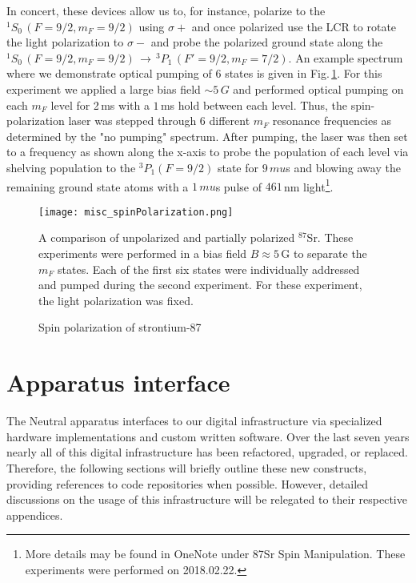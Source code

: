 In concert, these devices allow us to, for instance, polarize to the $^1S_0\,(F=9/2, m_F=9/2)$ using $\sigma+$ and once polarized use the LCR to rotate the light polarization to $\sigma-$ and probe the polarized ground state along the $^1S_0\,(F=9/2,m_F=9/2)\,\rightarrow\,^3P_1\,(F'=9/2,m_F=7/2)$.
An example spectrum where we demonstrate optical pumping of 6 states is given in Fig.\,\ref{fig:spinPolSpectra}. 
For this experiment we applied a large bias field $\sim5\,G$ and performed optical pumping on each $m_F$ level for 2\,ms with a $1\,$ms hold between each level.
Thus, the spin-polarization laser was stepped through 6 different $m_F$ resonance frequencies as determined by the "no pumping" spectrum.
After pumping, the laser was then set to a frequency as shown along the x-axis to probe the population of each level via shelving population to the $^3P_1 (F=9/2)$ state for $9\,mu$s and blowing away the remaining ground state atoms with a $1\,mu$s pulse of $461\,$nm light\footnote{More details may be found in OneNote under 87Sr Spin Manipulation. These experiments were performed on 2018.02.22.}.
	\begin{figure}
	\centerline{
		\texttt{[image: misc\_spinPolarization.png]}}
		\caption{Spin polarization of strontium-87}{A comparison of unpolarized and partially polarized $^{87}$Sr. These experiments were performed in a bias field $B\approx5\,$G to separate the $m_F$ states. Each of the first six states were individually addressed and pumped during the second experiment. For these experiment, the light polarization was fixed.}
		 \label{fig:spinPolSpectra}
	\end{figure}



\newpage
\section{Apparatus interface} \label{sec:electronics}
\setcounter{footnote}{0}
The Neutral apparatus interfaces to our digital infrastructure via specialized hardware implementations and custom written software.
Over the last seven years nearly all of this digital infrastructure has been refactored, upgraded, or replaced.
Therefore, the following sections will briefly outline these new constructs, providing references to code repositories when possible.
However, detailed discussions on the usage of this infrastructure will be relegated to their respective appendices.

